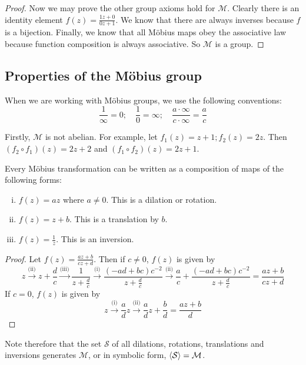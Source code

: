 \begin{proof}
	Now we may prove the other group axioms hold for \(\mathcal M\).
	Clearly there is an identity element \(f(z) = \frac{1z + 0}{0z + 1}\).
	We know that there are always inverses because \(f\) is a bijection.
	Finally, we know that all M\"obius maps obey the associative law because function composition is always associative.
	So \(\mathcal M\) is a group.
\end{proof}

\subsection{Properties of the M\"obius group}
When we are working with M\"obius groups, we use the following conventions:
\[
	\frac{1}{\infty} = 0;\quad \frac{1}{0} = \infty;\quad \frac{a\cdot\infty}{c\cdot\infty} = \frac{a}{c}
\]

Firstly, \(\mathcal M\) is not abelian.
For example, let \(f_1(z) = z + 1; f_2(z) = 2z\).
Then \((f_2 \circ f_1)(z) = 2z + 2\) and \((f_1 \circ f_2)(z) = 2z + 1\).

\begin{proposition}
	Every M\"obius transformation can be written as a composition of maps of the following forms:
	\begin{enumerate}[(i)]
		\item \(f(z) = az\) where \(a\neq 0\).
		      This is a dilation or rotation.
		\item \(f(z) = z + b\).
		      This is a translation by \(b\).
		\item \(f(z) = \frac{1}{z}\).
		      This is an inversion.
	\end{enumerate}
\end{proposition}
\begin{proof}
	Let \(f(z) = \frac{az + b}{cz + d}\).
	Then if \(c \neq 0\), \(f(z)\) is given by
	\[
		z \xrightarrow{\text{(ii)}} z + \frac{d}{c} \xrightarrow{\text{(iii)}} \frac{1}{z + \frac{d}{c}} \xrightarrow{\text{(i)}} \frac{(-ad+bc)c^{-2}}{z + \frac{d}{c}} \xrightarrow{\text{(ii)}} \frac{a}{c} + \frac{(-ad+bc)c^{-2}}{z + \frac{d}{c}} = \frac{az + b}{cz + d}
	\]
	If \(c = 0\), \(f(z)\) is given by
	\[
		z \xrightarrow{\text{(i)}} \frac{a}{d}z \xrightarrow{\text{(ii)}} \frac{a}{d}z + \frac{b}{d} = \frac{az + b}{d}
	\]
\end{proof}
Note therefore that the set \(\mathcal S\) of all dilations, rotations, translations and inversions generates \(\mathcal M\), or in symbolic form, \(\langle{} \mathcal S \rangle = \mathcal M\).

